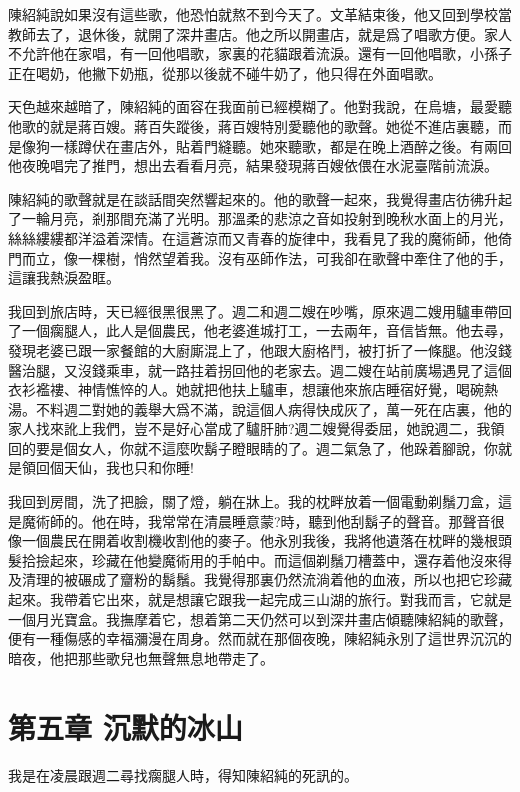 \documentclass[a6paper]{article}
\begin{document}
陳紹純說如果沒有這些歌，他恐怕就熬不到今天了。文革結束後，他又回到學校當教師去了，退休後，就開了深井畫店。他之所以開畫店，就是爲了唱歌方便。家人不允許他在家唱，有一回他唱歌，家裏的花貓跟着流淚。還有一回他唱歌，小孫子正在喝奶，他撇下奶瓶，從那以後就不碰牛奶了，他只得在外面唱歌。

天色越來越暗了，陳紹純的面容在我面前已經模糊了。他對我說，在烏塘，最愛聽他歌的就是蔣百嫂。蔣百失蹤後，蔣百嫂特別愛聽他的歌聲。她從不進店裏聽，而是像狗一樣蹲伏在畫店外，貼着門縫聽。她來聽歌，都是在晚上酒醉之後。有兩回他夜晚唱完了推門，想出去看看月亮，結果發現蔣百嫂依偎在水泥臺階前流淚。

陳紹純的歌聲就是在談話間突然響起來的。他的歌聲一起來，我覺得畫店彷彿升起了一輪月亮，剎那間充滿了光明。那溫柔的悲涼之音如投射到晚秋水面上的月光，絲絲縷縷都洋溢着深情。在這蒼涼而又青春的旋律中，我看見了我的魔術師，他倚門而立，像一棵樹，悄然望着我。沒有巫師作法，可我卻在歌聲中牽住了他的手，這讓我熱淚盈眶。

我回到旅店時，天已經很黑很黑了。週二和週二嫂在吵嘴，原來週二嫂用驢車帶回了一個瘸腿人，此人是個農民，他老婆進城打工，一去兩年，音信皆無。他去尋，發現老婆已跟一家餐館的大廚廝混上了，他跟大廚格鬥，被打折了一條腿。他沒錢醫治腿，又沒錢乘車，就一路拄着拐回他的老家去。週二嫂在站前廣場遇見了這個衣衫襤褸、神情憔悴的人。她就把他扶上驢車，想讓他來旅店睡宿好覺，喝碗熱湯。不料週二對她的義舉大爲不滿，說這個人病得快成灰了，萬一死在店裏，他的家人找來訛上我們，豈不是好心當成了驢肝肺?週二嫂覺得委屈，她說週二，我領回的要是個女人，你就不這麼吹鬍子瞪眼睛的了。週二氣急了，他跺着腳說，你就是領回個天仙，我也只和你睡!

我回到房間，洗了把臉，關了燈，躺在牀上。我的枕畔放着一個電動剃鬚刀盒，這是魔術師的。他在時，我常常在清晨睡意蒙?時，聽到他刮鬍子的聲音。那聲音很像一個農民在開着收割機收割他的麥子。他永別我後，我將他遺落在枕畔的幾根頭髮拾撿起來，珍藏在他變魔術用的手帕中。而這個剃鬚刀槽蓋中，還存着他沒來得及清理的被碾成了齏粉的鬍鬚。我覺得那裏仍然流淌着他的血液，所以也把它珍藏起來。我帶着它出來，就是想讓它跟我一起完成三山湖的旅行。對我而言，它就是一個月光寶盒。我撫摩着它，想着第二天仍然可以到深井畫店傾聽陳紹純的歌聲，便有一種傷感的幸福瀰漫在周身。然而就在那個夜晚，陳紹純永別了這世界沉沉的暗夜，他把那些歌兒也無聲無息地帶走了。

\pagebreak

\section{第五章 沉默的冰山}

我是在凌晨跟週二尋找瘸腿人時，得知陳紹純的死訊的。
\end{document}
